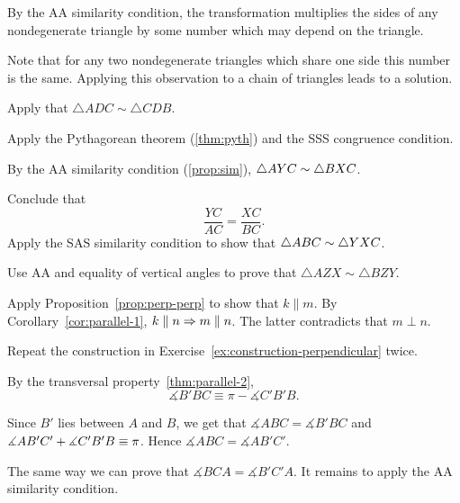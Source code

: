 By the AA similarity condition, the transformation multiplies the sides of any nondegenerate triangle by some number which may depend on the triangle. 

Note that for any two nondegenerate triangles which share one side this number is the same.
Applying this observation to a chain of triangles leads to a solution.

Apply that $\triangle ADC\sim \triangle CDB$.

Apply the Pythagorean theorem (\ref{thm:pyth}) and the SSS congruence condition.


By the AA similarity condition (\ref{prop:sim}), $\triangle AYC\z\sim \triangle BXC$.

Conclude that 
\[\frac{YC}{AC}=\frac{XC}{BC}.\]
Apply the SAS similarity condition to show that $\triangle ABC\z\sim \triangle YXC$.

Use AA and equality of vertical angles to prove that $\triangle AZX\sim \triangle BZY$.


\setcounter{eqtn}{0}


Apply Proposition~\ref{prop:perp-perp} to show that $k\parallel m$.
By Corollary~\ref{cor:parallel-1}, $k\parallel n\z\Rightarrow m\parallel n$.
The latter contradicts that $m\perp n$.

Repeat the construction in Exercise~\ref{ex:construction-perpendicular} twice.

By the transversal property~\ref{thm:parallel-2},
\[\measuredangle B'BC \equiv \pi -\measuredangle C'B'B.\]

Since $B'$ lies between $A$ and $B$, we get that 
$\measuredangle ABC=\measuredangle B'BC$ and $\measuredangle AB'C'+\measuredangle C'B'B\z\equiv \pi$.
Hence $\measuredangle ABC= \measuredangle AB'C'$.

The same way we can prove that 
$\measuredangle BCA= \measuredangle B'C'A$.
It remains to apply the AA similarity condition.

